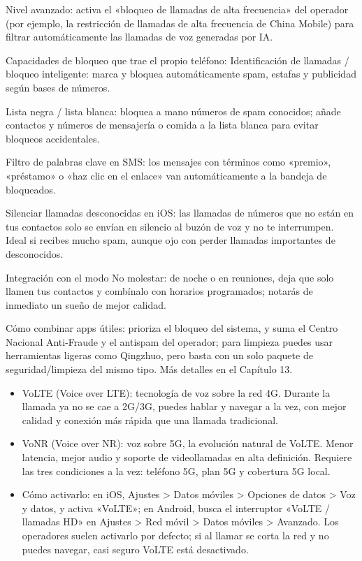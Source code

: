 Nivel avanzado: activa el «bloqueo de llamadas de alta frecuencia» del operador (por ejemplo, la restricción de llamadas de alta frecuencia de China Mobile) para filtrar automáticamente las llamadas de voz generadas por IA.

Capacidades de bloqueo que trae el propio teléfono: Identificación de llamadas / bloqueo inteligente: marca y bloquea automáticamente spam, estafas y publicidad según bases de números.

Lista negra / lista blanca: bloquea a mano números de spam conocidos; añade contactos y números de mensajería o comida a la lista blanca para evitar bloqueos accidentales.

Filtro de palabras clave en SMS: los mensajes con términos como «premio», «préstamo» o «haz clic en el enlace» van automáticamente a la bandeja de bloqueados.

Silenciar llamadas desconocidas en iOS: las llamadas de números que no están en tus contactos solo se envían en silencio al buzón de voz y no te interrumpen. Ideal si recibes mucho spam, aunque ojo con perder llamadas importantes de desconocidos.

Integración con el modo No molestar: de noche o en reuniones, deja que solo llamen tus contactos y combínalo con horarios programados; notarás de inmediato un sueño de mejor calidad.

Cómo combinar apps útiles: prioriza el bloqueo del sistema, y suma el Centro Nacional Anti-Fraude y el antispam del operador; para limpieza puedes usar herramientas ligeras como Qingzhuo, pero basta con un solo paquete de seguridad/limpieza del mismo tipo. Más detalles en el Capítulo 13.


\begin{itemize}
  \item VoLTE (Voice over LTE): tecnología de voz sobre la red 4G. Durante la llamada ya no se cae a 2G/3G, puedes hablar y navegar a la vez, con mejor calidad y conexión más rápida que una llamada tradicional.
  \item VoNR (Voice over NR): voz sobre 5G, la evolución natural de VoLTE. Menor latencia, mejor audio y soporte de videollamadas en alta definición. Requiere las tres condiciones a la vez: teléfono 5G, plan 5G y cobertura 5G local.
  \item Cómo activarlo: en iOS, Ajustes > Datos móviles > Opciones de datos > Voz y datos, y activa «VoLTE»; en Android, busca el interruptor «VoLTE / llamadas HD» en Ajustes > Red móvil > Datos móviles > Avanzado. Los operadores suelen activarlo por defecto; si al llamar se corta la red y no puedes navegar, casi seguro VoLTE está desactivado.
\end{itemize}

